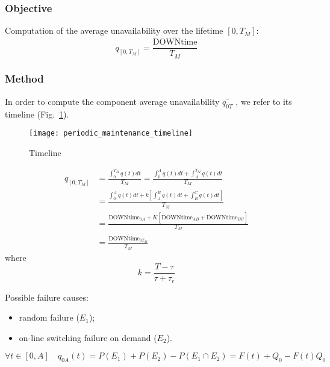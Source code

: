 \subsubsection*{Objective}
Computation of the average unavailability over the lifetime $[0,T_M]$:
\begin{equation*}
    q_{[0,T_M]} = \frac{\overline{\text{DOWNtime}}}{T_M}
\end{equation*}

\subsubsection*{Method}
In order to compute the component average unavailability $\overline{q_{0T}}$ ,
we refer to its timeline (Fig.~\ref{fig:periodic_maintenance_timeline}).

\begin{figure}[!htp]
    \centering
    \texttt{[image: periodic\_maintenance\_timeline]}
    \caption{Timeline}
    \label{fig:periodic_maintenance_timeline}
\end{figure}

\begin{equation*}
    \begin{split}
        q_{[0,T_M]} &= \frac{\int_0^{T_M}q(t)dt}{T_M} = \frac{\int_0^Aq(t)dt + \int_A^{T_M}q(t)dt}{T_M} \\
        &= \frac{\int_0^Aq(t)dt + k\left[\int_A^Bq(t)dt+\int_B^Cq(t)dt\right]}{T_M} \\
        &= \frac{\overline{\text{DOWNtime}_{0A}}+K[\overline{\text{DOWNtime}_{AB}}+ \overline{\text{DOWNtime}_{BC}}]}{T_M}  \\
        &= \frac{\overline{\text{DOWNtime}_{0T_M}}}{T_M} 
    \end{split}
\end{equation*}
where
\begin{equation*}
    k = \frac{T-\tau}{\tau+\tau_r}
\end{equation*}

 \par
Possible failure causes:
\begin{itemize}
    \item random failure ($E_1$);
    \item on-line switching failure on demand ($E_2$).
\end{itemize}

\begin{equation*}
    \forall t \in [0,A] \quad q_{0A}(t) = P(E_1)+P(E_2) - P(E_1\cap E_2) = F(t)+Q_0-F(t)Q_0
\end{equation*}

